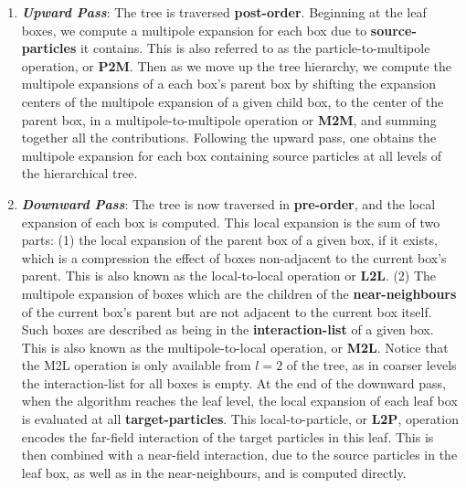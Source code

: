 \begin{enumerate}
    \item \textbf{\textit{Upward Pass}}: The tree is traversed \textbf{\gls{post-order}}.
    Beginning at the leaf boxes, we compute a multipole expansion for each box
    due to \textbf{\gls{source-particles}} it contains. This is also referred to as the particle-to-multipole
    operation, or \textbf{\gls{P2M}}. Then as we move up the tree hierarchy, we
    compute the multipole expansions of a each box's parent box by shifting the
    expansion centers of the multipole expansion of a given child box, to the center
    of the parent box, in a multipole-to-multipole operation or \textbf{\gls{M2M}},
    and summing together all the contributions. Following the upward pass, one
    obtains the multipole expansion for each box containing source particles at
    all levels of the hierarchical tree.
    \item \textbf{\textit{Downward Pass}}: The tree is now traversed in
    \textbf{\gls{pre-order}}, and the local expansion of each box is computed.
    This local expansion is the sum of two parts: (1) the local expansion of the
    parent box of a given box, if it exists, which is a compression the effect of boxes
    non-adjacent to the current box's parent. This is also known as the local-to-local
    operation or \textbf{\gls{L2L}}. (2) The multipole expansion of boxes which
    are the children of the \textbf{\gls{near-neighbours}} of the current box's
    parent but are not adjacent to the current box itself. Such boxes are described
    as being in the \textbf{\gls{interaction-list}} of a given box. This is also known as
    the multipole-to-local operation, or \textbf{\gls{M2L}}. Notice that the
    \gls{M2L} operation is only available from $l=2$ of the tree, as in coarser
    levels the \gls{interaction-list} for all boxes is empty. At the end of
    the downward pass, when the algorithm reaches the leaf level, the local expansion
    of each leaf box is evaluated at all \textbf{\gls{target-particles}}. This
    local-to-particle, or \textbf{\gls{L2P}}, operation encodes the \gls{far-field}
    interaction of the target particles in this leaf. This is then combined with
    a \gls{near-field} interaction, due to the source particles in the leaf box,
    as well as in the \gls{near-neighbours}, and is computed directly.
\end{enumerate}


